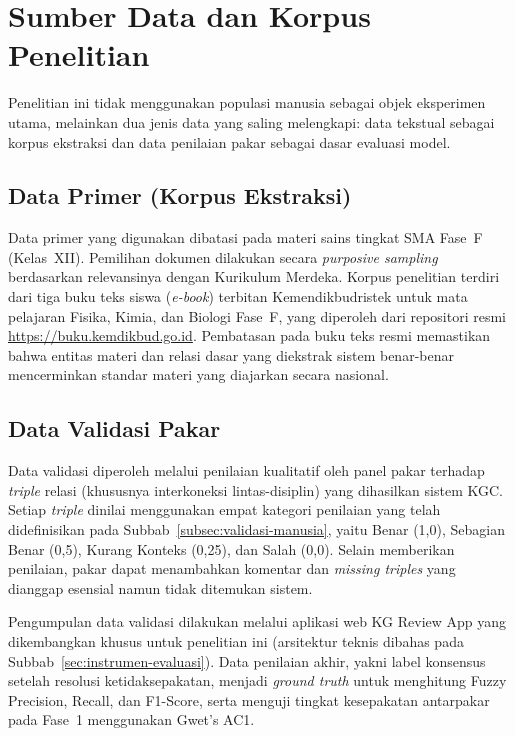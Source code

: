 \documentclass[main]{subfiles}
\begin{document}
\section{Sumber Data dan Korpus Penelitian}

Penelitian ini tidak menggunakan populasi manusia sebagai objek
eksperimen utama, melainkan dua jenis data yang saling melengkapi: data
tekstual sebagai korpus ekstraksi dan data penilaian pakar sebagai dasar
evaluasi model.

\subsection{Data Primer (Korpus Ekstraksi)}\label{subsec:data-primer}

Data primer yang digunakan dibatasi pada materi sains tingkat SMA
Fase~F (Kelas~XII). Pemilihan dokumen dilakukan secara
\textit{purposive sampling} berdasarkan relevansinya dengan Kurikulum
Merdeka. Korpus penelitian terdiri dari tiga buku teks siswa
(\textit{e-book}) terbitan Kemendikbudristek untuk mata pelajaran Fisika,
Kimia, dan Biologi Fase~F, yang diperoleh dari repositori resmi
\url{https://buku.kemdikbud.go.id}. Pembatasan pada buku teks resmi
memastikan bahwa entitas materi dan relasi dasar yang diekstrak sistem
benar-benar mencerminkan standar materi yang diajarkan secara nasional.

\subsection{Data Validasi Pakar}\label{subsec:data-validasi}

Data validasi diperoleh melalui penilaian kualitatif oleh panel pakar
terhadap \textit{triple} relasi (khususnya interkoneksi
lintas-disiplin) yang dihasilkan sistem KGC. Setiap \textit{triple}
dinilai menggunakan empat kategori penilaian yang telah didefinisikan pada
Subbab~\ref{subsec:validasi-manusia}, yaitu Benar (1,0), Sebagian Benar (0,5), Kurang Konteks
(0,25), dan Salah (0,0). Selain memberikan penilaian, pakar dapat
menambahkan komentar dan \textit{missing triples} yang dianggap esensial
namun tidak ditemukan sistem.

Pengumpulan data validasi dilakukan melalui aplikasi web KG Review App
yang dikembangkan khusus untuk penelitian ini (arsitektur teknis dibahas
pada Subbab~\ref{sec:instrumen-evaluasi}). Data penilaian akhir, yakni label
konsensus setelah resolusi ketidaksepakatan, menjadi
\textit{ground truth} untuk menghitung Fuzzy Precision, Recall, dan
F1-Score, serta menguji tingkat kesepakatan antarpakar pada Fase~1
menggunakan Gwet's AC1.
\end{document}
